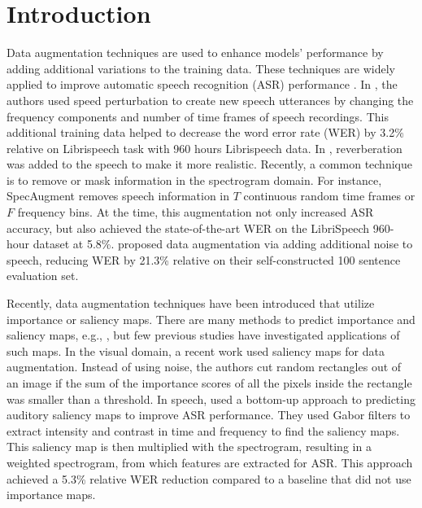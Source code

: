 \documentclass{article}
\begin{document}
\section{Introduction}
Data augmentation techniques are used to enhance models' performance by adding additional variations to the training data. These techniques are widely applied to improve automatic speech recognition (ASR) performance \cite{ko15_interspeech,kim17_interspeech,Hannun2014DeepSS,nguyen2020improving}. In \cite{ko15_interspeech}, the authors used speed perturbation to create new speech utterances by changing the frequency components and number of time frames of speech recordings. This additional training data helped to decrease the word error rate (WER) by 3.2\% relative on Librispeech task with 960 hours Librispeech data. In \cite{kim17_interspeech}, reverberation was added to the speech to make it more realistic. Recently, a common technique is to remove or mask information in the spectrogram domain. For instance, SpecAugment \cite{park2019specaugment} removes speech information in $T$ continuous random time frames or $F$ frequency bins. At the time, this augmentation not only increased ASR accuracy, but also achieved the state-of-the-art WER on the LibriSpeech 960-hour dataset at 5.8\%. \cite{Hannun2014DeepSS} proposed data augmentation via adding additional noise to speech, reducing WER by 21.3\% relative on their self-constructed 100 sentence evaluation set. 


Recently, data augmentation techniques have been introduced that utilize importance or saliency maps. There are many methods to predict importance and saliency maps, e.g., \cite{itti1998model,Harel2006,jetley2016end,Kummerer_2017_ICCV,hou2007saliency,pan2017salgan,kim2017bubbleview,spille2017listening,Trinh2020,trinh2018bubble,9271908}, but few previous studies have investigated applications of such maps. In the visual domain, a recent work \cite{gong2021keepaugment} used saliency maps for data augmentation. Instead of using noise, the authors cut random rectangles out of an image if the sum of the importance scores of all the pixels inside the rectangle was smaller than a threshold. In speech, \cite{do2018weighting} used a bottom-up approach to predicting auditory saliency maps to improve ASR performance. They used Gabor filters to extract intensity and contrast in time and frequency to find the saliency maps. This saliency map is then multiplied with the spectrogram, resulting in a weighted spectrogram, from which features are extracted for ASR. This approach achieved a 5.3\% relative WER reduction compared to a baseline that did not use importance maps. 
\end{document}
